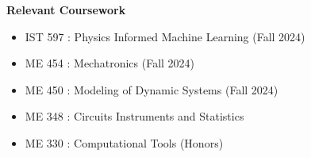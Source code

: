 \begin{center}
    \textbf{Relevant Coursework}
\end{center}



\begin{itemize}[noitemsep, topsep=0pt, partopsep=0pt, parsep=0pt]
    \item IST 597 : Physics Informed Machine Learning (Fall 2024)
    \item ME 454 : Mechatronics (Fall 2024)
    \item ME 450 : Modeling of Dynamic Systems (Fall 2024)
    \item ME 348 : Circuits Instruments and Statistics
    \item ME 330 : Computational Tools (Honors)
\end{itemize}

